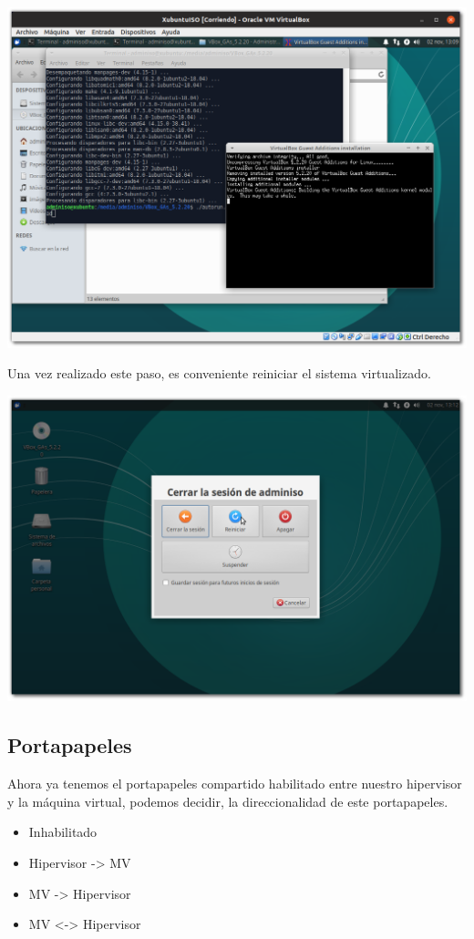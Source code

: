 \documentclass[11pt]{article}
\begin{document}
\begin{center}
\includegraphics[width=.9\linewidth]{imgs/VBox_GuestAdd_LinuX_023.png}
\end{center}

Una vez realizado este paso, es conveniente reiniciar el sistema
virtualizado.

\begin{center}
\includegraphics[width=.9\linewidth]{imgs/VBox_GuestAdd_LinuX_026.png}
\end{center}

\subsection{Portapapeles}
\label{sec:org125ef95}
Ahora ya tenemos el portapapeles compartido habilitado entre nuestro
hipervisor y la máquina virtual, podemos decidir, la direccionalidad de
este portapapeles.

\begin{itemize}
\item Inhabilitado
\item Hipervisor -> MV
\item MV -> Hipervisor
\item MV <-> Hipervisor
\end{itemize}
\end{document}
